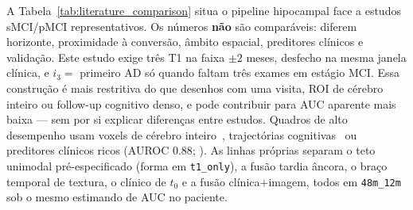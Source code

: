 \documentclass[review]{elsarticle}
\newcommand{\code}[1]{\texttt{#1}}
\begin{document}
A Tabela~\ref{tab:literature_comparison} situa o pipeline hipocampal face a estudos sMCI/pMCI representativos.
Os números \textbf{não} são comparáveis: diferem horizonte, proximidade à conversão, âmbito espacial, preditores clínicos e validação.
Este estudo exige três T1 na faixa $\pm 2$ meses, desfecho na mesma janela clínica, e $i_3=$ primeiro AD só quando faltam três exames em estágio MCI.
Essa construção é mais restritiva do que desenhos com uma visita, ROI de cérebro inteiro ou follow-up cognitivo denso, e pode contribuir para AUC aparente mais baixa --- sem por si explicar diferenças entre estudos.
Quadros de alto desempenho usam voxels de cérebro inteiro~\citep{moradi-2015,ye-2012}, trajectórias cognitivas~\citep{bucholc-2023} ou preditores clínicos ricos (AUROC $0.88$; \citealp{grassi-2019}).
As linhas próprias separam o teto unimodal pré-especificado (forma em \code{t1\_only}), a fusão tardia âncora, o braço temporal de textura, o clínico de $t_0$ e a fusão clínica$+$imagem, todos em \code{48m\_12m} sob o mesmo estimando de AUC no paciente.
\end{document}
